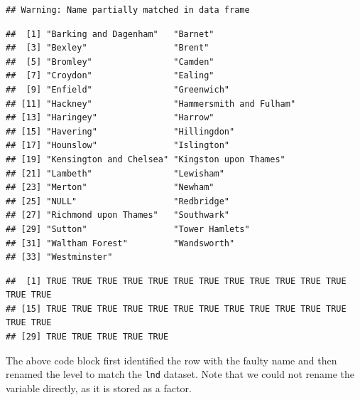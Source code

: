 \documentclass[]{article}
\newenvironment{Shaded}{}{}
\newcommand{\KeywordTok}[1]{\textcolor[rgb]{0.00,0.44,0.13}{\textbf{{#1}}}}
\newcommand{\DecValTok}[1]{\textcolor[rgb]{0.25,0.63,0.44}{{#1}}}
\newcommand{\StringTok}[1]{\textcolor[rgb]{0.25,0.44,0.63}{{#1}}}
\newcommand{\CommentTok}[1]{\textcolor[rgb]{0.38,0.63,0.69}{\textit{{#1}}}}
\newcommand{\NormalTok}[1]{{#1}}
\begin{document}
\begin{verbatim}
## Warning: Name partially matched in data frame
\end{verbatim}

\begin{verbatim}
##  [1] "Barking and Dagenham"   "Barnet"                
##  [3] "Bexley"                 "Brent"                 
##  [5] "Bromley"                "Camden"                
##  [7] "Croydon"                "Ealing"                
##  [9] "Enfield"                "Greenwich"             
## [11] "Hackney"                "Hammersmith and Fulham"
## [13] "Haringey"               "Harrow"                
## [15] "Havering"               "Hillingdon"            
## [17] "Hounslow"               "Islington"             
## [19] "Kensington and Chelsea" "Kingston upon Thames"  
## [21] "Lambeth"                "Lewisham"              
## [23] "Merton"                 "Newham"                
## [25] "NULL"                   "Redbridge"             
## [27] "Richmond upon Thames"   "Southwark"             
## [29] "Sutton"                 "Tower Hamlets"         
## [31] "Waltham Forest"         "Wandsworth"            
## [33] "Westminster"
\end{verbatim}

\begin{Shaded}
\end{Shaded}

\begin{verbatim}
##  [1] TRUE TRUE TRUE TRUE TRUE TRUE TRUE TRUE TRUE TRUE TRUE TRUE TRUE TRUE
## [15] TRUE TRUE TRUE TRUE TRUE TRUE TRUE TRUE TRUE TRUE TRUE TRUE TRUE TRUE
## [29] TRUE TRUE TRUE TRUE TRUE
\end{verbatim}

The above code block first identified the row with the faulty name and
then renamed the level to match the \texttt{lnd} dataset. Note that we
could not rename the variable directly, as it is stored as a factor.
\end{document}
